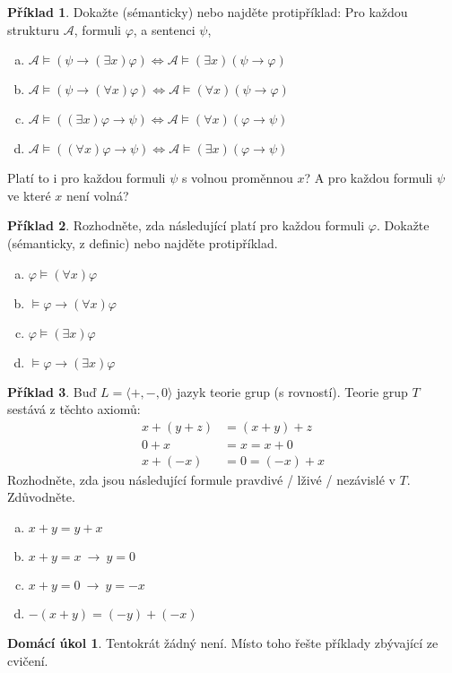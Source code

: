 \documentclass[a4paper]{article}
\theoremstyle{definition}
\newtheorem{problem}{Příklad}
\newtheorem*{ukol}{Domácí úkol}
\begin{document}
    
\medskip\begin{problem}
    Dokažte (sémanticky) nebo najděte protipříklad: Pro každou strukturu $\mathcal{A}$, formuli $\varphi$, a sentenci $\psi$,
    \begin{enumerate}[(a)]
    \item $\mathcal{A}\models (\psi \to (\exists x)\varphi) \Leftrightarrow \mathcal{A}\models (\exists x)(\psi \to \varphi)$
    \item $\mathcal{A}\models (\psi \to (\forall x)\varphi) \Leftrightarrow \mathcal{A}\models (\forall x)(\psi \to \varphi)$
    \item $\mathcal{A}\models ((\exists x)\varphi \to \psi) \Leftrightarrow \mathcal{A}\models (\forall x)(\varphi \to \psi)$
    \item $\mathcal{A}\models ((\forall x)\varphi \to \psi ) \Leftrightarrow \mathcal{A}\models (\exists x)(\varphi \to \psi)$
    \end{enumerate}
    Platí to i pro každou formuli $\psi$ s volnou proměnnou $x$? A pro každou formuli $\psi$ ve které $x$ není volná?
\end{problem}
    

\medskip\begin{problem}
    Rozhodněte, zda následující platí pro každou formuli $\varphi$. Dokažte (sémanticky, z definic) nebo najděte protipříklad.
    \begin{enumerate}[(a)]
       \item $\varphi \models (\forall x)\varphi$
       \item $\models \varphi \to (\forall x)\varphi$
       \item $\varphi \models (\exists x)\varphi$
       \item $\models \varphi \to (\exists x)\varphi$
    \end{enumerate}
\end{problem}
    
    
\medskip\begin{problem}
    Buď $L=\langle +, -, 0\rangle$ jazyk teorie grup (s rovností). Teorie grup $T$ sestává z těchto axiomů:
    \begin{align*}
    x+(y+z)&=(x+y)+z\\
    0+x&=x=x+0\\
    x+(-x)&=0=(-x)+x
    \end{align*}
    Rozhodněte, zda jsou následující formule pravdivé / lživé / nezávislé v $T$. Zdůvodněte.
    \begin{enumerate}[(a)]
        \item $x+y=y+x$
        \item $x+y=x\ \rightarrow\ y=0$
        \item $x+y=0\ \rightarrow\ y=-x$
        \item $-(x+y)=(-y)+(-x)$
    \end{enumerate}
\end{problem}


\medskip\begin{ukol}
Tentokrát žádný není. Místo toho řešte příklady zbývající ze cvičení.
\end{ukol}
\end{document}
